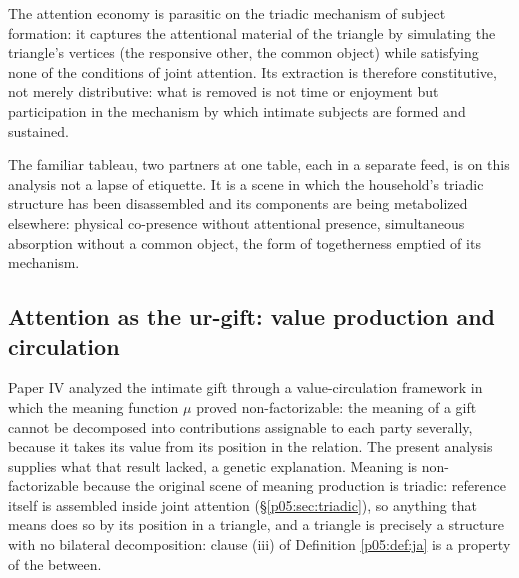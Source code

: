 \begin{prop}\label{p05:prop:parasite}
The attention economy is parasitic on the triadic mechanism of subject formation: it captures the attentional material of the triangle by simulating the triangle's vertices (the responsive other, the common object) while satisfying none of the conditions of joint attention. Its extraction is therefore constitutive, not merely distributive: what is removed is not time or enjoyment but participation in the mechanism by which intimate subjects are formed and sustained.
\end{prop}

The familiar tableau, two partners at one table, each in a separate feed, is on this analysis not a lapse of etiquette. It is a scene in which the household's triadic structure has been disassembled and its components are being metabolized elsewhere: physical co-presence without attentional presence, simultaneous absorption without a common object, the form of togetherness emptied of its mechanism.

\subsection{Attention as the ur-gift: value production and circulation}
\label{p05:sec:urgift}

Paper IV analyzed the intimate gift through a value-circulation framework in which the meaning function $\mu$ proved non-factorizable: the meaning of a gift cannot be decomposed into contributions assignable to each party severally, because it takes its value from its position in the relation. The present analysis supplies what that result lacked, a genetic explanation. Meaning is non-factorizable because the original scene of meaning production is triadic: reference itself is assembled inside joint attention (§\ref{p05:sec:triadic}), so anything that means does so by its position in a triangle, and a triangle is precisely a structure with no bilateral decomposition: clause (iii) of Definition \ref{p05:def:ja} is a property of the between.

